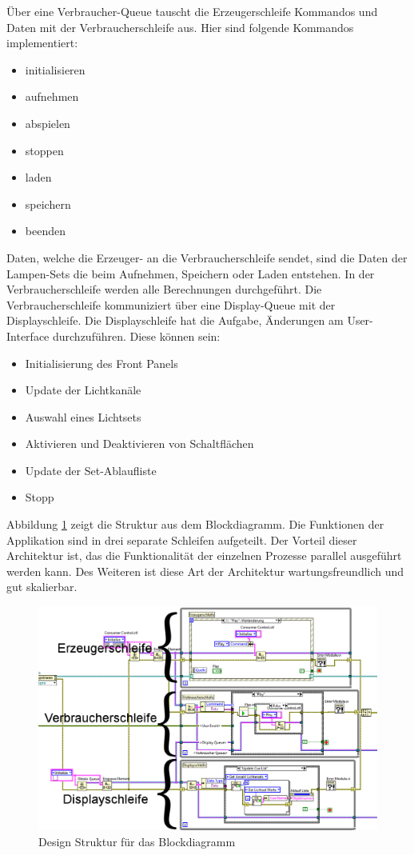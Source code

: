 Über eine Verbraucher-Queue tauscht die Erzeugerschleife Kommandos und Daten mit der Verbraucherschleife aus. Hier sind folgende Kommandos implementiert:
\begin{itemize}
\item initialisieren
\item aufnehmen
\item abspielen
\item stoppen
\item laden
\item speichern 
\item beenden
\end{itemize}
Daten, welche die Erzeuger- an die Verbraucherschleife sendet, sind die Daten der Lampen-Sets die beim Aufnehmen, Speichern oder Laden entstehen. 
In der Verbraucherschleife werden alle Berechnungen durchgeführt. Die Verbraucherschleife kommuniziert über eine Display-Queue mit der Displayschleife.
Die Displayschleife hat die Aufgabe, Änderungen am User-Interface durchzuführen. Diese können sein:
\begin{itemize}
\item Initialisierung des Front Panels
\item Update der Lichtkanäle
\item Auswahl eines Lichtsets
\item Aktivieren und Deaktivieren von Schaltflächen
\item Update der Set-Ablaufliste
\item Stopp
\end{itemize}

Abbildung \ref{fig:schleifen} zeigt die Struktur aus dem Blockdiagramm. 
Die Funktionen der Applikation sind in drei separate Schleifen aufgeteilt. Der Vorteil dieser Architektur ist, das die Funktionalität der einzelnen Prozesse parallel ausgeführt werden kann. 
Des Weiteren ist diese Art der Architektur wartungsfreundlich und gut skalierbar. 


	\begin{figure}%
	\centering
		\includegraphics[width=\textwidth]{Pics/ueberblick004.png}
	\caption{Design Struktur für das Blockdiagramm}
	\label{fig:schleifen}
	\end{figure}
 		

